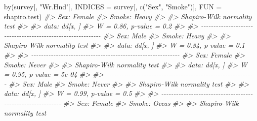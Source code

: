 \documentclass[
]{book}
\newenvironment{Shaded}{\begin{snugshade}}{\end{snugshade}}
\newcommand{\AttributeTok}[1]{\textcolor[rgb]{0.77,0.63,0.00}{#1}}
\newcommand{\CommentTok}[1]{\textcolor[rgb]{0.56,0.35,0.01}{\textit{#1}}}
\newcommand{\FunctionTok}[1]{\textcolor[rgb]{0.00,0.00,0.00}{#1}}
\newcommand{\NormalTok}[1]{#1}
\newcommand{\StringTok}[1]{\textcolor[rgb]{0.31,0.60,0.02}{#1}}
\begin{document}
\begin{Shaded}
\begin{Highlighting}[]
\FunctionTok{by}\NormalTok{(survey[,  }\StringTok{"Wr.Hnd"}\NormalTok{], }\AttributeTok{INDICES =}\NormalTok{ survey[, }\FunctionTok{c}\NormalTok{(}\StringTok{"Sex"}\NormalTok{, }\StringTok{"Smoke"}\NormalTok{)], }\AttributeTok{FUN =}\NormalTok{ shapiro.test)}
\CommentTok{\#\textgreater{} Sex: Female}
\CommentTok{\#\textgreater{} Smoke: Heavy}
\CommentTok{\#\textgreater{} }
\CommentTok{\#\textgreater{}  Shapiro{-}Wilk normality test}
\CommentTok{\#\textgreater{} }
\CommentTok{\#\textgreater{} data:  dd[x, ]}
\CommentTok{\#\textgreater{} W = 0.86, p{-}value = 0.2}
\CommentTok{\#\textgreater{} }
\CommentTok{\#\textgreater{} {-}{-}{-}{-}{-}{-}{-}{-}{-}{-}{-}{-}{-}{-}{-}{-}{-}{-}{-}{-}{-}{-}{-}{-}{-}{-}{-}{-}{-}{-}{-}{-}{-}{-}{-}{-}{-}{-}{-}{-}{-}{-}{-}{-}{-}{-}{-}{-}{-}{-}{-}{-}{-}{-}{-}{-}{-}{-}{-}{-} }
\CommentTok{\#\textgreater{} Sex: Male}
\CommentTok{\#\textgreater{} Smoke: Heavy}
\CommentTok{\#\textgreater{} }
\CommentTok{\#\textgreater{}  Shapiro{-}Wilk normality test}
\CommentTok{\#\textgreater{} }
\CommentTok{\#\textgreater{} data:  dd[x, ]}
\CommentTok{\#\textgreater{} W = 0.84, p{-}value = 0.1}
\CommentTok{\#\textgreater{} }
\CommentTok{\#\textgreater{} {-}{-}{-}{-}{-}{-}{-}{-}{-}{-}{-}{-}{-}{-}{-}{-}{-}{-}{-}{-}{-}{-}{-}{-}{-}{-}{-}{-}{-}{-}{-}{-}{-}{-}{-}{-}{-}{-}{-}{-}{-}{-}{-}{-}{-}{-}{-}{-}{-}{-}{-}{-}{-}{-}{-}{-}{-}{-}{-}{-} }
\CommentTok{\#\textgreater{} Sex: Female}
\CommentTok{\#\textgreater{} Smoke: Never}
\CommentTok{\#\textgreater{} }
\CommentTok{\#\textgreater{}  Shapiro{-}Wilk normality test}
\CommentTok{\#\textgreater{} }
\CommentTok{\#\textgreater{} data:  dd[x, ]}
\CommentTok{\#\textgreater{} W = 0.95, p{-}value = 5e{-}04}
\CommentTok{\#\textgreater{} }
\CommentTok{\#\textgreater{} {-}{-}{-}{-}{-}{-}{-}{-}{-}{-}{-}{-}{-}{-}{-}{-}{-}{-}{-}{-}{-}{-}{-}{-}{-}{-}{-}{-}{-}{-}{-}{-}{-}{-}{-}{-}{-}{-}{-}{-}{-}{-}{-}{-}{-}{-}{-}{-}{-}{-}{-}{-}{-}{-}{-}{-}{-}{-}{-}{-} }
\CommentTok{\#\textgreater{} Sex: Male}
\CommentTok{\#\textgreater{} Smoke: Never}
\CommentTok{\#\textgreater{} }
\CommentTok{\#\textgreater{}  Shapiro{-}Wilk normality test}
\CommentTok{\#\textgreater{} }
\CommentTok{\#\textgreater{} data:  dd[x, ]}
\CommentTok{\#\textgreater{} W = 0.99, p{-}value = 0.5}
\CommentTok{\#\textgreater{} }
\CommentTok{\#\textgreater{} {-}{-}{-}{-}{-}{-}{-}{-}{-}{-}{-}{-}{-}{-}{-}{-}{-}{-}{-}{-}{-}{-}{-}{-}{-}{-}{-}{-}{-}{-}{-}{-}{-}{-}{-}{-}{-}{-}{-}{-}{-}{-}{-}{-}{-}{-}{-}{-}{-}{-}{-}{-}{-}{-}{-}{-}{-}{-}{-}{-} }
\CommentTok{\#\textgreater{} Sex: Female}
\CommentTok{\#\textgreater{} Smoke: Occas}
\CommentTok{\#\textgreater{} }
\CommentTok{\#\textgreater{}  Shapiro{-}Wilk normality test}

\end{Highlighting}
\end{Shaded}
\end{document}

